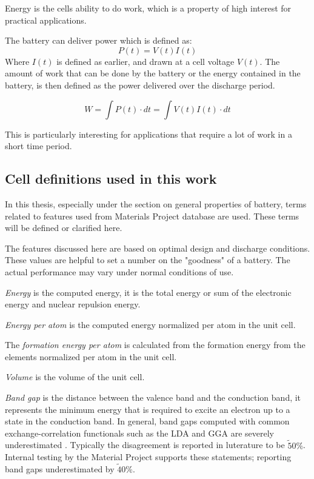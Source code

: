 	Energy is the cells ability to do work, which is a property of high interest for practical applications.
		
	The battery can deliver power which is defined as:
	\begin{equation}
	P(t)=V(t)I(t)
	\end{equation}
	Where $I(t)$ is defined as earlier, and drawn at a cell voltage $V(t)$. The amount of work that can be done by the battery or the energy contained in the battery, is then defined as the power delivered over the discharge period.
	
	\begin{equation}
	W = \int P(t) \cdot dt = \int V(t)I(t) \cdot dt
	\end{equation}
	
	This is particularly interesting for applications that require a lot of work in a short time period.	

\subsection{Cell definitions used in this work }\label{sec:theory_bat}
In this thesis, especially under the section on general properties of battery, terms related to features used from Materials Project database are used. These terms will be defined or clarified here.

	The features discussed here are based on optimal design and discharge conditions. These values are helpful to set a number on the "goodness" of a battery. The actual performance may vary under normal conditions of use.
	

	\textit{Energy} is the computed energy, it is the total energy or sum of the electronic energy and nuclear repulsion energy.
	
	\textit{Energy per atom} is the computed energy normalized per atom in the unit cell.
	
	The \textit{formation energy per atom} is calculated from the formation energy from the elements normalized per atom in the unit cell.

	
	\textit{Volume} is the volume of the unit cell.
	
	\textit{Band gap} is the distance between the valence band and the conduction band, it represents the minimum energy that is required to excite an electron up to a state in the conduction band. In general, band gaps computed with common exchange-correlation functionals such as the LDA \cite{perdew1983physical} and GGA are severely underestimated \cite{perdew1985density}. Typically the disagreement is reported in luterature to be $\tilde 50\%$. Internal testing by the Material Project supports these statements; reporting band gaps underestimated by $\tilde40\%$.
	

